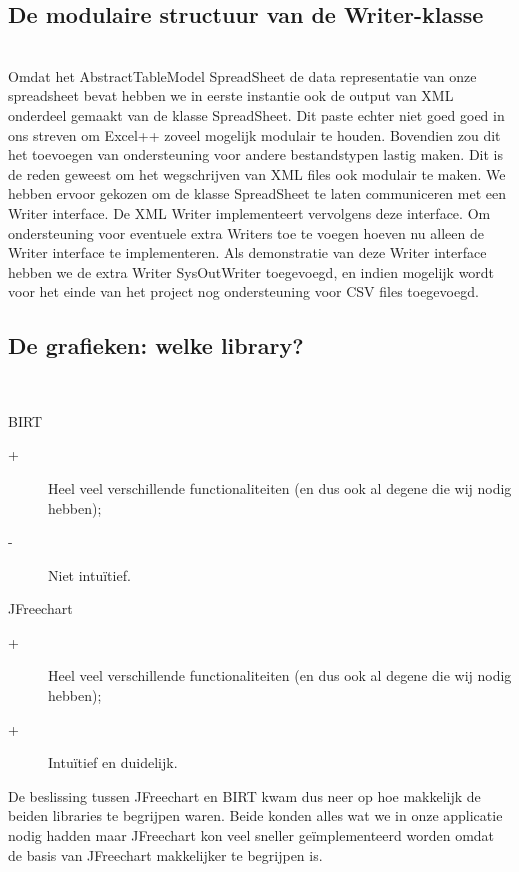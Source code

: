 \documentclass[a4paper,11pt]{article}
\begin{document}
\subsection{De modulaire structuur van de Writer-klasse}\mbox{}\\
Omdat het AbstractTableModel SpreadSheet de data representatie van onze spreadsheet bevat hebben we in eerste instantie ook de output van XML onderdeel gemaakt van de klasse SpreadSheet. Dit paste echter niet goed goed in ons streven om Excel++ zoveel mogelijk modulair te houden. Bovendien zou dit het toevoegen van ondersteuning voor andere bestandstypen lastig maken. Dit is de reden geweest om het wegschrijven van XML files ook modulair te maken. We hebben ervoor gekozen om de klasse SpreadSheet te laten communiceren met een Writer interface. De XML Writer implementeert vervolgens deze interface. Om ondersteuning voor eventuele extra Writers toe te voegen hoeven nu alleen de Writer interface te implementeren. Als demonstratie van deze Writer interface hebben we de extra Writer SysOutWriter toegevoegd, en indien mogelijk wordt voor het einde van het project nog ondersteuning voor CSV files toegevoegd.

\subsection{De grafieken: welke library?}\mbox{}\\
\begin{description}
	\item BIRT
		\begin{description}
			\item[+] Heel veel verschillende functionaliteiten (en dus ook al degene die wij nodig hebben);
			\item[-] Niet intuïtief.
		\end{description}
	\item JFreechart
		\begin{description}
			\item[+] Heel veel verschillende functionaliteiten (en dus ook al degene die wij nodig hebben);
			\item[+] Intuïtief en duidelijk.
		\end{description}
\end{description}

De beslissing tussen JFreechart en BIRT kwam dus neer op hoe makkelijk de beiden libraries te begrijpen waren. Beide konden alles wat we in onze applicatie nodig hadden maar JFreechart kon veel sneller geïmplementeerd worden omdat de basis van JFreechart makkelijker te begrijpen is.
\end{document}
